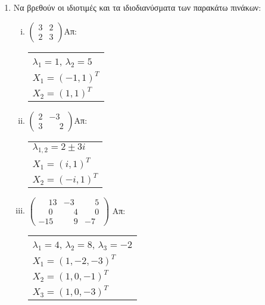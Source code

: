 



\thispagestyle{empty}





\begin{center}
\end{center}

\vspace{\baselineskip}

\begin{enumerate}

\item Να βρεθούν οι ιδιοτιμές και τα ιδιοδιανύσματα των παρακάτω πινάκων:

\begin{enumerate}[i)]

\item $\begin{pmatrix}
3 & 2 \\
2 & 3
\end{pmatrix}$\hfill Απ: \begin{tabular}{l}
$\lambda_1=1$, $\lambda_2=5$ \\
$X_1=(-1,1)^T$ \\
$X_2=(1,1)^T$
\end{tabular}

\item $\begin{pmatrix}
2 & -3 \\
3 & \phantom{-}2
\end{pmatrix}$\hfill Απ: \begin{tabular}{l}
$\lambda_{1,2}=2\pm 3i$ \\
$X_1=(i,1)^T$ \\
$X_2=(-i,1)^T$
\end{tabular}

\item $\begin{pmatrix}
\phantom{-}13 & -3 & \phantom{-}5 \\
\phantom{-}0 & \phantom{-}4 & \phantom{-}0 \\
-15 & \phantom{-}9 & -7
\end{pmatrix}$ \hfill Απ: \begin{tabular}{l}
$\lambda_1=4$, $\lambda_2=8$, $\lambda_3=-2$ \\ 
$X_1=(1,-2,-3)^T$ \\
$X_2=(1,0,-1)^T$ \\
$X_3=(1,0,-3)^T$
\end{tabular}


\end{enumerate}
\end{enumerate}
